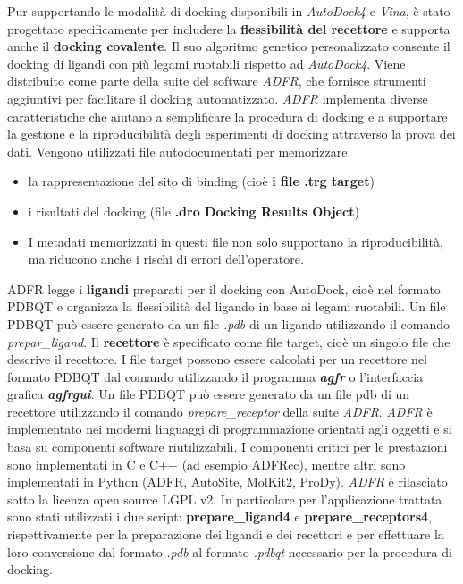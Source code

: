 Pur supportando le modalità di docking disponibili in \textit{AutoDock4} e \textit{Vina}, è stato progettato specificamente per includere la \textbf{flessibilità del recettore} e supporta anche il \textbf{docking covalente}. Il suo algoritmo genetico personalizzato consente il docking di ligandi con più legami ruotabili rispetto ad \textit{AutoDock4}.\newline
Viene distribuito come parte della suite del software \textit{ADFR}, che fornisce strumenti aggiuntivi per facilitare il docking automatizzato.\newline
\textit{ADFR} implementa diverse caratteristiche che aiutano a semplificare la procedura di docking e a supportare la gestione e la riproducibilità degli esperimenti di docking attraverso la prova dei dati. Vengono utilizzati file autodocumentati per memorizzare: 

\begin{itemize}
    \item la rappresentazione del sito di binding (cioè \textbf{i file .trg target})
    \item i risultati del docking (file \textbf{.dro Docking Results Object})
    \item I metadati memorizzati in questi file non solo supportano la riproducibilità, ma riducono anche i rischi di errori dell'operatore.
\end{itemize}

ADFR legge i \textbf{ligandi} preparati per il docking con AutoDock, cioè nel formato PDBQT e organizza la flessibilità del ligando in base ai legami ruotabili. Un file PDBQT può essere generato da un file \textit{.pdb} di un ligando utilizzando il comando \textit{prepar\_ligand}.  Il \textbf{recettore} è specificato come file target, cioè un singolo file che descrive il recettore. I file target possono essere calcolati per un recettore nel formato PDBQT dal comando utilizzando il programma \textit{\textbf{agfr}} o l'interfaccia grafica \textit{\textbf{agfrgui}}. Un file PDBQT può essere generato da un file pdb di un recettore utilizzando il comando \textit{prepare\_receptor} della suite \textit{ADFR}. \newline
\textit{ADFR} è implementato nei moderni linguaggi di programmazione orientati agli oggetti e si basa su componenti software riutilizzabili. I componenti critici per le prestazioni sono implementati in C e C++ (ad esempio ADFRcc), mentre altri sono implementati in Python (ADFR, AutoSite, MolKit2, ProDy). \textit{ADFR} è rilasciato sotto la licenza open source LGPL v2.\newline 
In particolare per l'applicazione trattata sono stati utilizzati i due script: \textbf{prepare\_ligand4} e \textbf{prepare\_receptors4}, rispettivamente per la preparazione dei ligandi e dei recettori e per effettuare la loro conversione dal formato \textit{.pdb} al formato \textit{.pdbqt} necessario per la procedura di docking.

